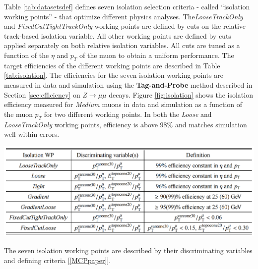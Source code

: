 \par \hspace{20pt} Table \ref{tab:datasetsdef} defines seven isolation selection criteria - called ``isolation working points'' - that optimize different physics analyses. The\textit{LooseTrackOnly} and \textit{FixedCutTightTrackOnly} working points are defined by cuts on the relative track-based isolation variable. All other working points are defined by cuts applied separately on both relative isolation variables. All cuts are tuned as a function of the $\eta$ and $p_T$ of the muon to obtain a uniform performance. The target efficiencies of the different working points are described in Table \ref{tab:isolation}. The efficiencies for the seven isolation working points are measured in data and simulation using the \textbf{Tag-and-Probe} method described in Section \ref{sec:efficiency} on $Z \rightarrow \mu\mu$ decays. Figure \ref{fig:isolation} shows the isolation efficiency measured for \textit{Medium} muons in data and simulation as a function of the muon $p_T$ for two different working points. In both the \textit{Loose} and \textit{LooseTrackOnly} working points, efficiency is above $98\%$ and matches simulation well within errors. 

\begin{table}[!h]
	\centering 
    \includegraphics[width=.9\textwidth]{Pictures/isolationworkingpoints.PNG}
    \caption{The seven isolation working points are described by their discriminating variables and defining criteria [\ref{MCPpaper}].}
    \label{tab:isolation}
\end{table}

